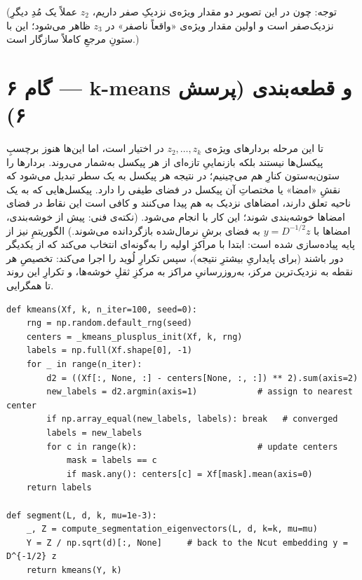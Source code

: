 \documentclass[13pt]{extarticle}
\newenvironment{pycode}{\begin{latin}\lstset{style=py}}{\end{latin}}
\newcommand{\file}[1]{\lr{\texttt{#1}}}
\begin{document}
\noindent (توجه: چون در این تصویر دو مقدار ویژه‌ی نزدیکِ صفر داریم، $z_2$ عملاً یک مُدِ دیگرِ نزدیک‌صفر است و اولین مقدار ویژه‌ی «واقعاً ناصفر» در $z_3$ ظاهر می‌شود؛ این با ستونِ مرجعِ \file{eigh} کاملاً سازگار است.)

\section{گام ۶ --- k-means و قطعه‌بندی (پرسش ۶)}

تا این مرحله بردارهای ویژه‌ی $z_2,\dots,z_k$ در اختیار است، اما این‌ها هنوز برچسبِ پیکسل‌ها نیستند بلکه بازنماییِ تازه‌ای از هر پیکسل به‌شمار می‌روند. بردارها را ستون‌به‌ستون کنارِ هم می‌چینیم؛ در نتیجه هر پیکسل به یک سطر تبدیل می‌شود که نقشِ «امضا» یا مختصاتِ آن پیکسل در فضای طیفی را دارد. پیکسل‌هایی که به یک ناحیه تعلق دارند، امضاهای نزدیک به هم پیدا می‌کنند و کافی است این نقاط در فضای امضاها خوشه‌بندی شوند؛ این کار با  انجام می‌شود. (نکته‌ی فنی: پیش از خوشه‌بندی، امضاها با $y=D^{-1/2}z$ به فضای برشِ نرمال‌شده بازگردانده می‌شوند.) الگوریتمِ  نیز از پایه پیاده‌سازی شده است: ابتدا با  مراکزِ اولیه را به‌گونه‌ای انتخاب می‌کند که از یکدیگر دور باشند (برای پایداریِ بیشترِ نتیجه)، سپس تکرارِ لُوید را اجرا می‌کند: تخصیصِ هر نقطه به نزدیک‌ترین مرکز، به‌روزرسانیِ مراکز به مرکزِ ثقلِ خوشه‌ها، و تکرارِ این روند تا همگرایی.

\begin{pycode}
\begin{lstlisting}
def kmeans(Xf, k, n_iter=100, seed=0):
    rng = np.random.default_rng(seed)
    centers = _kmeans_plusplus_init(Xf, k, rng)
    labels = np.full(Xf.shape[0], -1)
    for _ in range(n_iter):
        d2 = ((Xf[:, None, :] - centers[None, :, :]) ** 2).sum(axis=2)
        new_labels = d2.argmin(axis=1)            # assign to nearest center
        if np.array_equal(new_labels, labels): break   # converged
        labels = new_labels
        for c in range(k):                        # update centers
            mask = labels == c
            if mask.any(): centers[c] = Xf[mask].mean(axis=0)
    return labels

def segment(L, d, k, mu=1e-3):
    _, Z = compute_segmentation_eigenvectors(L, d, k=k, mu=mu)
    Y = Z / np.sqrt(d)[:, None]     # back to the Ncut embedding y = D^{-1/2} z
    return kmeans(Y, k)
\end{lstlisting}
\end{pycode}
\end{document}
